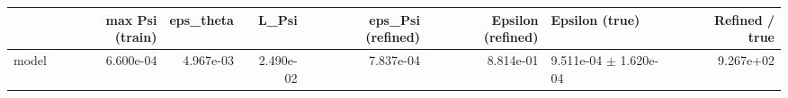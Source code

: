 \begin{tabular}{lrrrrrlr}
\toprule
 & max Psi (train) & eps\_theta & L\_Psi & eps\_Psi (refined) & Epsilon (refined) & Epsilon (true) & Refined / true \\
\midrule
model & 6.600e-04 & 4.967e-03 & 2.490e-02 & 7.837e-04 & 8.814e-01 & 9.511e-04 $\pm$ 1.620e-04 & 9.267e+02 \\
\bottomrule
\end{tabular}

